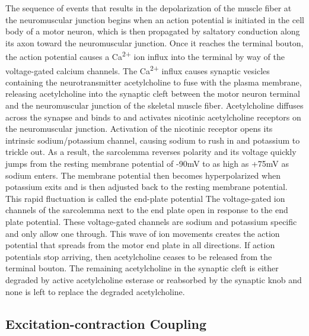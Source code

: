 The sequence of events that results in the depolarization of the muscle fiber at the neuromuscular junction begins when an action potential is initiated in the cell body of a motor neuron, which is then propagated by saltatory conduction along its axon toward the neuromuscular junction. Once it reaches the terminal bouton, the action potential causes a Ca\textsuperscript{2+} ion influx into the terminal by way of the voltage-gated calcium channels. The Ca\textsuperscript{2+} influx causes synaptic vesicles containing the neurotransmitter acetylcholine to fuse with the plasma membrane, releasing acetylcholine into the synaptic cleft between the motor neuron terminal and the neuromuscular junction of the skeletal muscle fiber. Acetylcholine diffuses across the synapse and binds to and activates nicotinic acetylcholine receptors on the neuromuscular junction. Activation of the nicotinic receptor opens its intrinsic sodium/potassium channel, causing sodium to rush in and potassium to trickle out. As a result, the sarcolemma reverses polarity and its voltage quickly jumps from the resting membrane potential of -90mV to as high as +75mV as sodium enters. The membrane potential then becomes hyperpolarized when potassium exits and is then adjusted back to the resting membrane potential. This rapid fluctuation is called the end-plate potential The voltage-gated ion channels of the sarcolemma next to the end plate open in response to the end plate potential. These voltage-gated channels are sodium and potassium specific and only allow one through. This wave of ion movements creates the action potential that spreads from the motor end plate in all directions. If action potentials stop arriving, then acetylcholine ceases to be released from the terminal bouton. The remaining acetylcholine in the synaptic cleft is either degraded by active acetylcholine esterase or reabsorbed by the synaptic knob and none is left to replace the degraded acetylcholine.

\hypertarget{excitation-contraction-coupling}{%
\subsection{Excitation-contraction Coupling}\label{excitation-contraction-coupling}}

